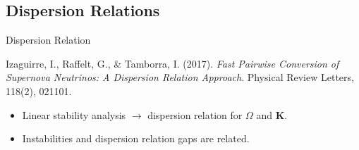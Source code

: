 


\subsection{Dispersion Relations}


\begin{frame}{ Dispersion Relation }

    \begin{tcolorbox}[standard jigsaw,opacityback=0]
        \color{white}
        Izaguirre, I., Raffelt, G., \& Tamborra, I. (2017). \emph{Fast Pairwise Conversion of Supernova Neutrinos: A Dispersion Relation Approach}. Physical Review Letters, 118(2), 021101.
    \end{tcolorbox}


    \begin{itemize}[<+->]
        \item Linear stability analysis $\rightarrow$ dispersion relation for $\Omega$ and $\mathbf K$.
        \item Instabilities and dispersion relation gaps are related.
    \end{itemize}

    \end{frame}


